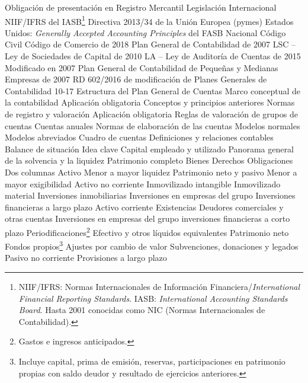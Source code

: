 \documentclass{nuevotema}
\begin{document}
\begin{esquemal}
				\4 Obligación de presentación en Registro Mercantil
		\2 Legislación
			\3 Internacional
				\4 NIIF/IFRS del IASB\footnote{NIIF/IFRS: Normas Internacionales de Información Financiera/\textit{International Financial Reporting Standards}. IASB: \textit{International Accounting Standards Board}. Hasta 2001 conocidas como NIC (Normas Internacionales de Contabilidad).}
				\4 Directiva 2013/34 de la Unión Europea (pymes)
				\4 Estados Unidos:
				\4[] \textit{Generally Accepted Accounting Principles} del FASB
			\3 Nacional
				\4 Código Civil
				\4 Código de Comercio de 2018
				\4 Plan General de Contabilidad de 2007
				\4 LSC -- Ley de Sociedades de Capital de 2010
				\4 LA -- Ley de Auditoría de Cuentas de 2015
				\4[] Modificado en 2007
				\4 Plan General de Contabilidad de Pequeñas y Medianas Empresas de 2007
				\4 RD 602/2016 de modificación de Planes Generales de Contabilidad
	\1  10-17
		\2 Estructura del Plan General de Cuentas
			\3[I] Marco conceptual de la contabilidad
				\4 Aplicación obligatoria
				\4 Conceptos y principios anteriores
			\3[II] Normas de registro y valoración
				\4 Aplicación obligatoria
				\4 Reglas de valoración de grupos de cuentas
			\3[III] Cuentas anuales
				\4 Normas de elaboración de las cuentas
				\4 Modelos normales
				\4 Modelos abreviados
			\3[IV] Cuadro de cuentas
			\3[V] Definiciones y relaciones contables
		\2[I] Balance de situación
			\3 Idea clave
				\4 Capital empleado y utilizado
				\4 Panorama general de la solvencia y la liquidez
			\3 Patrimonio completo
				\4 Bienes
				\4 Derechos
				\4 Obligaciones
			\3 Dos columnas
				\4 Activo
				\4[] Menor a mayor liquidez
				\4 Patrimonio neto y pasivo
				\4[] Menor a mayor exigibilidad
			\3[i] Activo no corriente
				\4 Inmovilizado intangible
				\4 Inmovilizado material
				\4 Inversiones inmobiliarias
				\4 Inversiones en empresas del grupo
				\4 Inversiones financieras a largo plazo
			\3[ii] Activo corriente
				\4 Existencias
				\4 Deudores comerciales y otras cuentas
				\4 Inversiones en empresas del grupo
				\4 inversiones financieras a corto plazo
				\4 Periodificaciones\footnote{Gastos e ingresos anticipados.}
				\4 Efectivo y otros líquidos equivalentes
			\3[i'] Patrimonio neto
				\4 Fondos propios\footnote{Incluye capital, prima de emisión, reservas, participaciones en patrimonio propias con saldo deudor y resultado de ejercicios anteriores.}
				\4 Ajustes por cambio de valor
				\4 Subvenciones, donaciones y legados
			\3[ii'] Pasivo no corriente
				\4 Provisiones a largo plazo

\end{esquemal}
\end{document}
